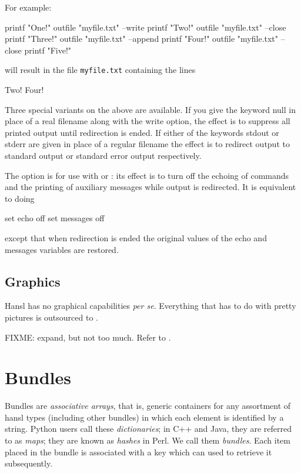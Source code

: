 For example:
\begin{code}
  printf "One!\n"
  outfile "myfile.txt" --write
  printf "Two!\n"
  outfile "myfile.txt" --close
  printf "Three!\n"
  outfile "myfile.txt" --append
  printf "Four!\n"
  outfile "myfile.txt" --close
  printf "Five!\n"
\end{code}
will result in the file \texttt{myfile.txt} containing the lines
\begin{code}
Two!
Four!  
\end{code}

Three special variants on the above are available. If you give the
keyword null in place of a real filename along with the write option, the effect is to suppress all printed output until redirection
is ended. If either of the keywords stdout or stderr are given in
place of a regular filename the effect is to redirect output to
standard output or standard error output respectively.

The  option is for use with  or
: its effect is to turn off the echoing of commands and
the printing of auxiliary messages while output is redirected. It is
equivalent to doing
\begin{code}
  set echo off 
  set messages off
\end{code}
except that when redirection is ended the original values of the echo
and messages variables are restored.

\section{Graphics}

Hansl has no graphical capabilities \emph{per se}. Everything that has
to do with pretty pictures is outsourced to . 

FIXME: expand, but not too much. Refer to \GUG.

\chapter{Bundles}
\label{chap:bundles}

Bundles are \emph{associative arrays}, that is, generic containers for
any assortment of hansl types (including other bundles) in which each
element is identified by a string. Python users call these
\emph{dictionaries}; in C++ and Java, they are referred to as
\emph{maps}; they are known as \emph{hashes} in Perl. We call them
\emph{bundles}. Each item placed in the bundle is associated with a
key which can used to retrieve it subsequently.

